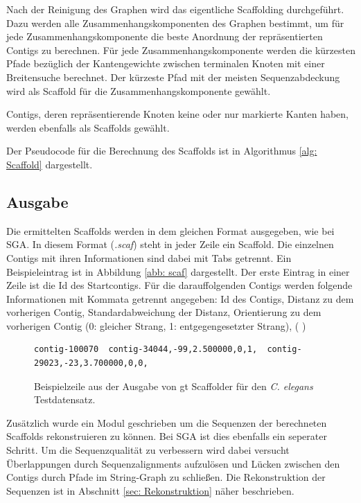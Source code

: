 \documentclass[a4paper,10pt,parskip]{scrartcl}
\begin{document}
Nach der Reinigung des Graphen wird das eigentliche Scaffolding
durchgeführt. Dazu werden alle Zusammenhangskomponenten des Graphen
bestimmt, um für jede Zusammenhangskomponente die beste Anordnung der
repräsentierten Contigs zu berechnen. Für jede Zusammenhangskomponente
werden die kürzesten Pfade bezüglich der Kantengewichte zwischen
terminalen Knoten mit einer Breitensuche berechnet. Der kürzeste Pfad
mit der meisten Sequenzabdeckung wird als Scaffold für die
Zusammenhangskomponente gewählt.

Contigs, deren repräsentierende Knoten keine oder nur markierte Kanten
haben, werden ebenfalls als Scaffolds gewählt.

Der Pseudocode für die Berechnung des Scaffolds ist in Algorithmus
\ref{alg: Scaffold} dargestellt.

\subsection{Ausgabe}
Die ermittelten Scaffolds werden in dem gleichen Format ausgegeben,
wie bei SGA. In diesem Format (\textit{.scaf}) steht in jeder Zeile
ein Scaffold. Die einzelnen Contigs mit ihren Informationen sind dabei
mit Tabs getrennt. Ein Beispieleintrag ist in Abbildung \ref{abb:
  scaf} dargestellt. Der erste Eintrag in einer Zeile ist die Id des
Startcontigs. Für die darauffolgenden Contigs werden folgende
Informationen mit Kommata getrennt angegeben: Id des Contigs, Distanz
zu dem vorherigen Contig, Standardabweichung der Distanz, Orientierung
zu dem vorherigen Contig (0: gleicher Strang, 1: entgegengesetzter
Strang), ( )

\begin{figure}
\begin{verbatim}
contig-100070  contig-34044,-99,2.500000,0,1,  contig-29023,-23,3.700000,0,0,
\end{verbatim}
\caption{\label{abb: scaf}Beispielzeile aus der Ausgabe von gt
  Scaffolder für den \textit{C. elegans} Testdatensatz.}
\end{figure}

Zusätzlich wurde ein Modul geschrieben um die Sequenzen der
berechneten Scaffolds rekonstruieren zu können. Bei SGA ist dies
ebenfalls ein seperater Schritt. Um die Sequenzqualität zu verbessern
wird dabei versucht Überlappungen durch Sequenzalignments aufzulösen
und Lücken zwischen den Contigs durch Pfade im String-Graph zu
schließen. Die Rekonstruktion der Sequenzen ist in Abschnitt \ref{sec:
  Rekonstruktion} näher beschrieben.
\end{document}
